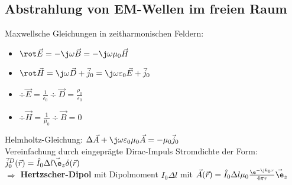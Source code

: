 \documentclass[german, fourcolumn, 6pt]{latex4ei/latex4ei_sheet}
\begin{document}
    \subsection{Abstrahlung von EM-Wellen im freien Raum}
    Maxwellsche Gleichungen in zeitharmonischen Feldern:
    \begin{itemize}
    \item $\rot\vec E = -\j\omega\vec B = -\j\omega\mu_0\vec H$
    \item $\rot\vec H = \j\omega\vec D + \vec j_0 = \j\omega\varepsilon_0\vec E+\vec j_0$
    \item $\div\vec E = \frac{1}{\epsilon_0}\div\vec D = \frac{\rho_0}{\varepsilon_0}$
    \item $\div\vec H = \frac{1}{\mu_0}\div\vec B = 0$
    \end{itemize}
    Helmholtz-Gleichung: $\Delta\vec A + \j\omega\varepsilon_0\mu_0\vec A = -\mu_0\vec j_0$\\
    Vereinfachung durch eingeprägte Dirac-Impuls Stromdichte der Form: $\vec j_0^D(\vec  r) = \hat I_0\Delta l\vec\e_z\delta(\vec r)$\\
$\Rightarrow$ \textbf{Hertzscher-Dipol} mit Dipolmoment $I_0\Delta l$ mit $\vec A(\vec r) = \hat I_0\Delta l\mu_0\frac{\e^{-\j k_0r}}{4\pi r}\vec\e_z$\\
\end{document}
